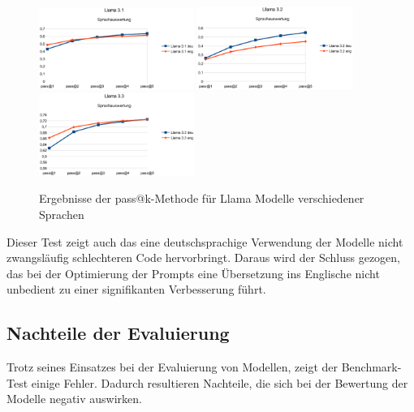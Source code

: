 \begin{figure}[!ht]
	\includegraphics[width=0.45\textwidth]{content/chapter_evaluation/images/llama31_evaluation_lang.eps}
	\includegraphics[width=0.45\textwidth]{content/chapter_evaluation/images/llama32_evaluation_lang.eps}
	\includegraphics[width=0.45\textwidth]{content/chapter_evaluation/images/llama33_evaluation_lang.eps}
	\caption{Ergebnisse der pass@k-Methode für Llama Modelle verschiedener Sprachen}
	\label{img:pass_at_k_results_by_llama_lang}
\end{figure}

Dieser Test zeigt auch das eine deutschsprachige Verwendung der Modelle nicht zwangsläufig schlechteren Code hervorbringt. Daraus wird der Schluss gezogen, das bei der Optimierung der Prompts eine Übersetzung ins Englische nicht unbedient zu einer signifikanten Verbesserung führt.

\subsection{Nachteile der Evaluierung}\label{subsec:disadvantages_of_evaluation}
Trotz seines Einsatzes bei der Evaluierung von Modellen, zeigt der Benchmark-Test einige Fehler. Dadurch resultieren Nachteile, die sich bei der Bewertung der Modelle negativ auswirken.\vspace{0.2cm}

